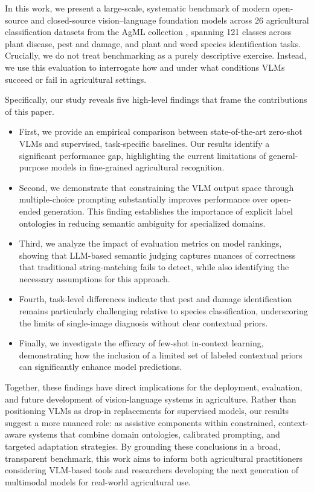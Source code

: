 \documentclass[10pt,letterpaper]{article}
\begin{document}
In this work, we present a large-scale, systematic benchmark of modern open-source and closed-source vision–language foundation models across 26 agricultural classification datasets from the AgML collection \cite{joshi_standardizing_2023}, spanning 121 classes across plant disease, pest and damage, and plant and weed species identification tasks. Crucially, we do not treat benchmarking as a purely descriptive exercise. Instead, we use this evaluation to interrogate how and under what conditions VLMs succeed or fail in agricultural settings.

Specifically, our study reveals five high-level findings that frame the contributions of this paper. 

\begin{itemize}
    \item First, we provide an empirical comparison between state-of-the-art zero-shot VLMs and supervised, task-specific baselines. Our results identify a significant performance gap, highlighting the current limitations of general-purpose models in fine-grained agricultural recognition.
    \item Second, we demonstrate that constraining the VLM output space through multiple-choice prompting substantially improves performance over open-ended generation. This finding establishes the importance of explicit label ontologies in reducing semantic ambiguity for specialized domains.
    \item Third, we analyze the impact of evaluation metrics on model rankings, showing that LLM-based semantic judging captures nuances of correctness that traditional string-matching fails to detect, while also identifying the necessary assumptions for this approach. 
    \item Fourth, task-level differences indicate that pest and damage identification remains particularly challenging relative to species classification, underscoring the limits of single-image diagnosis without clear contextual priors.
    \item Finally, we investigate the efficacy of few-shot in-context learning, demonstrating how the inclusion of a limited set of labeled contextual priors can significantly enhance model predictions.
\end{itemize}

Together, these findings have direct implications for the deployment, evaluation, and future development of vision-language systems in agriculture. Rather than positioning VLMs as drop-in replacements for supervised models, our results suggest a more nuanced role: as assistive components within constrained, context-aware systems that combine domain ontologies, calibrated prompting, and targeted adaptation strategies. By grounding these conclusions in a broad, transparent benchmark, this work aims to inform both agricultural practitioners considering VLM-based tools and researchers developing the next generation of multimodal models for real-world agricultural use.
\end{document}
